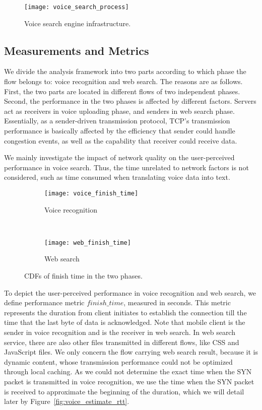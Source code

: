 \begin{figure}[th]
	\centering
	\texttt{[image: voice\_search\_process]}
	\caption{Voice search engine infrastructure.}
	\label{fig:voice_search}
\end{figure}

\subsection{Measurements and Metrics}

We divide the analysis framework into two parts according to which phase the flow belongs to: voice recognition and web search. The reasons are as follows. First, the two parts are located in different flows of two independent phases. Second, the performance in the two phases is affected by different factors. Servers act as receivers in voice uploading phase, and senders in web search phase. Essentially, as a sender-driven transmission protocol, TCP's transmission performance is basically affected by the efficiency that sender could handle congestion events, as well as the capability that receiver could receive data.

We mainly investigate the impact of network quality on the user-perceived performance in voice search. Thus, the time unrelated to network factors is not considered, such as time consumed when translating voice data into text.

\begin{figure}[th]
\centering
\begin{subfigure}[b]{0.8\linewidth}
	\texttt{[image: voice\_finish\_time]}
\caption{Voice recognition}
\label{fig:voice_finish_time}
\end{subfigure} \\
\begin{subfigure}[b]{0.8\linewidth}
	\texttt{[image: web\_finish\_time]}
\caption{Web search}
\label{fig:web_finish_time}
\end{subfigure}
\caption{CDFs of finish time in the two phases.}
\label{fig:finish_time}
\end{figure}

To depict the user-perceived performance in voice recognition and web search, we define performance metric $finish\_time$, measured in seconds. This metric represents the duration from client initiates to establish the connection till the time that the last byte of data is acknowledged. Note that mobile client is the sender in voice recognition and is the receiver in web search. In web search service, there are also other files transmitted in different flows, like CSS and JavaScript files. We only concern the flow carrying web search result, because it is dynamic content, whose transmission performance could not be optimized through local caching. As we could not determine the exact time when the SYN packet is transmitted in voice recognition, we use the time when the SYN packet is received to approximate the beginning of the duration, which we will detail later by Figure~\ref{fig:voice_estimate_rtt}.

